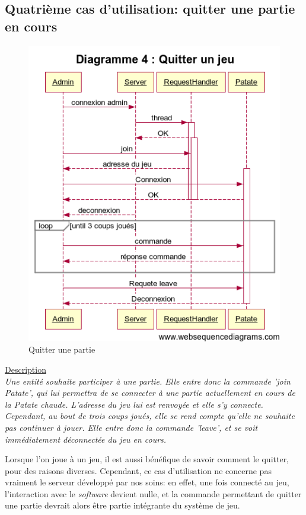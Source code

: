	\subsection{Quatrième cas d'utilisation: quitter une partie en cours}
	\begin{figure}[!ht]
		\center
		\includegraphics[scale=0.7]{images/sequence/diagramme_leave_cas1.png}
		\caption{Quitter une partie}
	\end{figure}
	
	\underline{Description}\\
	
	\textit{Une entité souhaite participer à une partie. Elle entre donc la commande 'join Patate', qui lui permettra de se connecter à une partie actuellement en cours de la Patate chaude. L'adresse du jeu lui est renvoyée et elle s'y connecte. Cependant, au bout de trois coups joués, elle se rend compte qu'elle ne souhaite pas continuer à jouer. Elle entre donc la commande 'leave', et se voit immédiatement déconnectée du jeu en cours.}\\
	
	\vspace{3em}
	
	Lorsque l'on joue à un jeu, il est aussi bénéfique de savoir comment le quitter, pour des raisons diverses. Cependant, ce cas d'utilisation ne concerne pas vraiment le serveur développé par nos soins: en effet, une fois connecté au jeu, l'interaction avec le \textit{software} devient nulle, et la commande permettant de quitter une partie devrait alors être partie intégrante du système de jeu.
	\newpage

